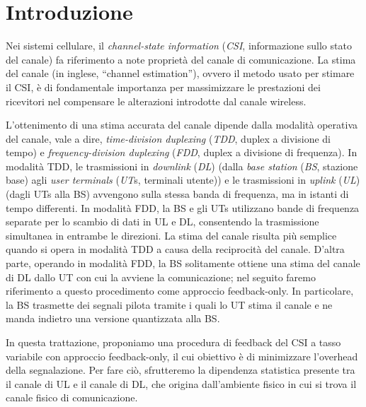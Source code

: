 \chapter{Introduzione}

\thispagestyle{empty}

\vfill

Nei sistemi cellulare, il \textit{channel-state information} (\textit{CSI},
informazione sullo stato del canale) fa riferimento a note proprietà del canale
di comunicazione. La stima del canale (in inglese, ``channel estimation''),
ovvero il metodo usato per stimare il CSI, è di fondamentale importanza per
massimizzare le prestazioni dei ricevitori nel compensare le alterazioni
introdotte dal canale wireless.

L'ottenimento di una stima accurata del canale dipende dalla modalità operativa
del canale, vale a dire, \textit{time-division duplexing} (\textit{TDD}, duplex
a divisione di tempo) e \textit{frequency-division duplexing} (\textit{FDD},
duplex a divisione di frequenza). In modalità TDD, le trasmissioni in
\textit{downlink} (\textit{DL}) (dalla \textit{base station} (\textit{BS},
stazione base) agli \textit{user terminals} (\textit{UT}s, terminali utente)) e
le trasmissioni in \textit{uplink} (\textit{UL}) (dagli UTs alla BS) avvengono
sulla stessa banda di frequenza, ma in istanti di tempo differenti. In modalità
FDD, la BS e gli UTs utilizzano bande di frequenza separate per lo scambio di
dati in UL e DL, consentendo la trasmissione simultanea in entrambe le
direzioni. La stima del canale risulta più semplice quando si opera in modalità
TDD a causa della reciprocità del canale. D'altra parte, operando in modalità
FDD, la BS solitamente ottiene una stima del canale di DL dallo UT con cui la
avviene la comunicazione; nel seguito faremo riferimento a questo procedimento
come approccio feedback-only.  In particolare, la BS trasmette dei segnali
pilota tramite i quali lo UT stima il canale e ne manda indietro una versione
quantizzata alla BS.

In questa trattazione, proponiamo una procedura di feedback del CSI a tasso
variabile con approccio feedback-only, il cui obiettivo è di minimizzare
l'overhead della segnalazione. Per fare ciò, sfrutteremo la dipendenza
statistica presente tra il canale di UL e il canale di DL, che origina
dall'ambiente fisico in cui si trova il canale fisico di comunicazione.


